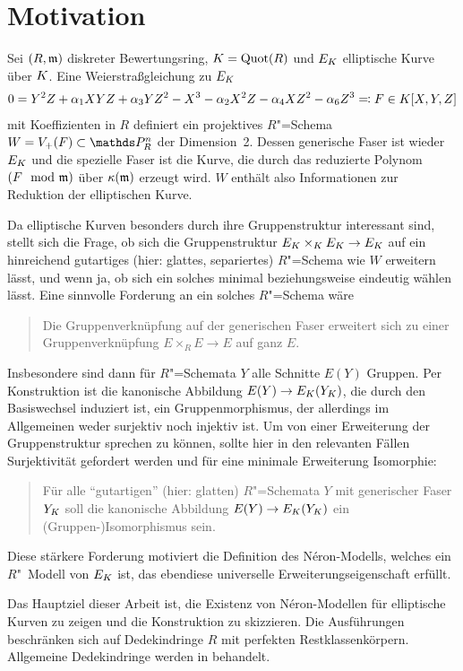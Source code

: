 \chapter{Motivation}

Sei $(R,\mathfrak{m})$ diskreter Bewertungsring, $K=\operatorname{Quot}(R)$ und $E_{K}$
elliptische Kurve über $K$. Eine Weierstraßgleichung zu $E_{K}$
\begin{gather*}
  0 = Y^2 Z + \alpha_1 XYZ + \alpha_3 YZ^2 - X^3 - \alpha_2X^2 Z - \alpha_4 XZ^2 - \alpha_6 Z^3
  \eqqcolon F\in K[X,Y,Z]  
\end{gather*}
mit Koeffizienten in $R$ definiert ein projektives $R$"=Schema
$W=V_+(F)\subset\P_R^n$ der Dimension~2. Dessen generische Faser
ist wieder $E_{K}$ und die spezielle Faser ist die Kurve, die durch das
reduzierte Polynom $(F\mod{\mathfrak{m}})$ über $\kappa(\mathfrak{m})$ erzeugt wird.
$W$ enthält also Informationen zur Reduktion der elliptischen
Kurve.

Da elliptische Kurven besonders durch ihre Gruppenstruktur
interessant sind, stellt sich die Frage, ob sich die
Gruppenstruktur $E_{K}\times_{K} E_{K}\to E_{K}$ auf ein hinreichend
gutartiges (hier: glattes, separiertes) $R$"=Schema wie $W$ erweitern
lässt, und wenn ja, ob sich ein solches minimal beziehungsweise
eindeutig wählen lässt.
Eine sinnvolle Forderung an ein solches $R$"=Schema wäre
\begin{quote}
  Die Gruppenverknüpfung auf der generischen Faser erweitert sich zu
  einer Gruppenverknüpfung $E\times_R E\to E$ auf ganz $E$.
\end{quote}
Insbesondere sind dann für $R$"=Schemata $Y$ alle Schnitte $E(Y)$
Gruppen. Per Konstruktion ist die kanonische Abbildung
$E(Y)\to E_{K}(Y_{K})$, die durch den Basiswechsel induziert ist, ein
Gruppenmorphismus, der allerdings im Allgemeinen weder surjektiv noch
injektiv ist. Um von einer Erweiterung der Gruppenstruktur sprechen zu
können, sollte hier in den relevanten Fällen Surjektivität
gefordert werden und für eine minimale Erweiterung Isomorphie:
\begin{quote}
  Für alle \enquote{gutartigen} (hier: glatten) $R$"=Schemata $Y$ mit
  generischer Faser $Y_{K}$ soll die kanonische Abbildung
  $E(Y)\to E_{K}(Y_{K})$ ein (Gruppen-)Isomorphismus sein.
\end{quote}
Diese stärkere Forderung motiviert die Definition des
Néron-Modells, welches ein $R$"~Mo\-dell von $E_{K}$ ist, das ebendiese
universelle Erweiterungseigenschaft erfüllt.

Das Hauptziel dieser Arbeit ist, die Existenz von Néron-Modellen
für elliptische Kurven zu zeigen und die Konstruktion zu skizzieren.
Die Ausführungen beschränken sich auf Dedekindringe $R$ mit perfekten
Restklassenkörpern. Allgemeine Dedekindringe werden in
\cite{nonperfect} behandelt.


